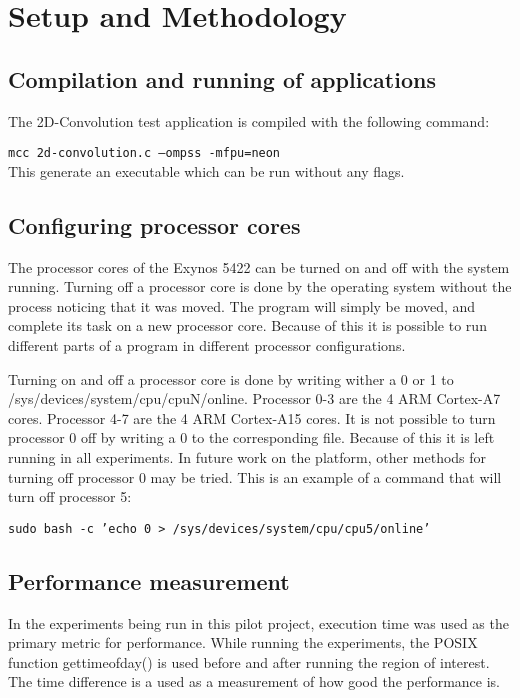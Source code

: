 \chapter[Setup and Methodology]{Setup and Methodology} \label{setupandmethodology}

\section{Compilation and running of applications}
The 2D-Convolution test application is compiled with the following command:

\texttt{mcc 2d-convolution.c --ompss -mfpu=neon}\\
This generate an executable which can be run without any flags.

\section{Configuring processor cores}
The processor cores of the Exynos 5422 can be turned on and off with the system running.
Turning off a processor core is done by the operating system without the process noticing that it was moved.
The program will simply be moved, and complete its task on a new processor core.
Because of this it is possible to run different parts of a program in different processor configurations.

Turning on and off a processor core is done by writing wither a 0 or 1 to /sys/devices/system/cpu/cpuN/online.
Processor 0-3 are the 4 ARM Cortex-A7 cores.
Processor 4-7 are the 4 ARM Cortex-A15 cores.
It is not possible to turn processor 0 off by writing a 0 to the corresponding file.
Because of this it is left running in all experiments.
In future work on the platform, other methods for turning off processor 0 may be tried.
This is an example of a command that will turn off processor 5:

\texttt{sudo bash -c 'echo 0 > /sys/devices/system/cpu/cpu5/online'}

\section{Performance measurement}
In the experiments being run in this pilot project, execution time was used as the primary metric for performance.
While running the experiments, the POSIX function gettimeofday() is used before and after running the region of interest.
The time difference is a used as a measurement of how good the performance is.

